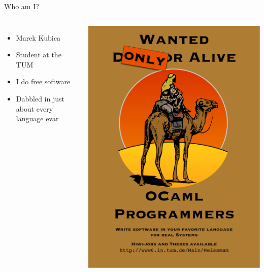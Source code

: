 \documentclass{beamer}
\begin{document}
\begin{frame}{Who am I?}
  \begin{columns}
      \begin{itemize}
        \item Marek Kubica
        \item Student at the TUM
        \item I do free software
        \item Dabbled in just about every language evar
      \end{itemize}
      \includegraphics[height=0.9\textheight]{programmers}
  \end{columns}
\end{frame}
\end{document}
